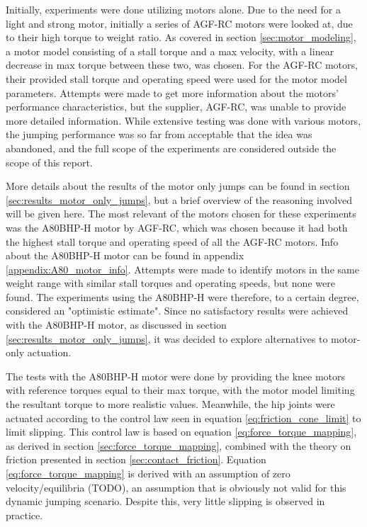 Initially, experiments were done utilizing motors alone. Due to the need for a light and strong motor, initially a series of AGF-RC motors were looked at, due to their high torque to weight ratio. As covered in section \ref{sec:motor_modeling}, a motor model consisting of a stall torque and a max velocity, with a linear decrease in max torque between these two, was chosen. For the AGF-RC motors, their provided stall torque and operating speed were used for the motor model parameters. Attempts were made to get more information about the motors' performance characteristics, but the supplier, AGF-RC, was unable to provide more detailed information. While extensive testing was done with various motors, the jumping performance was so far from acceptable that the idea was abandoned, and the full scope of the experiments are considered outside the scope of this report.

More details about the results of the motor only jumps can be found in section \ref{sec:results_motor_only_jumps}, but a brief overview of the reasoning involved will be given here. The most relevant of the motors chosen for these experiments was the A80BHP-H motor by AGF-RC, which was chosen because it had both the highest stall torque and operating speed of all the AGF-RC motors. Info about the A80BHP-H motor can be found in appendix \ref{appendix:A80_motor_info}. Attempts were made to identify motors in the same weight range with similar stall torques and operating speeds, but none were found. The experiments using the A80BHP-H were therefore, to a certain degree, considered an "optimistic estimate". Since no satisfactory results were achieved with the A80BHP-H motor, as discussed in section \ref{sec:results_motor_only_jumps}, it was decided to explore alternatives to motor-only actuation. 

The tests with the A80BHP-H motor were done by providing the knee motors with reference torques equal to their max torque, with the motor model limiting the resultant torque to more realistic values. Meanwhile, the hip joints were actuated according to the control law seen in equation \ref{eq:friction_cone_limit} to limit slipping. This control law is based on equation \ref{eq:force_torque_mapping}, as derived in section \ref{sec:force_torque_mapping}, combined with the theory on friction presented in section \ref{sec:contact_friction}. Equation \ref{eq:force_torque_mapping} is derived with an assumption of zero velocity/equilibria (TODO), an assumption that is obviously not valid for this dynamic jumping scenario. Despite this, very little slipping is observed in practice.   

